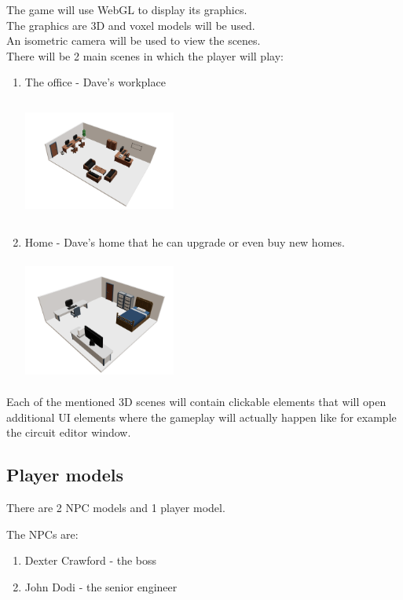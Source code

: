 \documentclass[12pt]{article}
\begin{document}
The game will use WebGL to display its graphics.\\
The graphics are 3D and voxel models will be used.\\
An isometric camera will be used to view the scenes.\\
There will be 2 main scenes in which the player will play:\\
\begin{enumerate}
    \item The office - Dave's workplace
          \begin{center}
              \includegraphics[width=5cm, height=4cm]{office.png}
          \end{center}
          \pagebreak
    \item Home - Dave's home that he can upgrade or even buy new homes.
          \begin{center}
              \includegraphics[width=5cm, height=4cm]{home.png}
          \end{center}
\end{enumerate}

Each of the mentioned 3D scenes will contain clickable elements that will open additional UI elements where the gameplay will actually happen 
like for example the circuit editor window.
\pagebreak

\subsection{Player models}
There are 2 NPC models and 1 player model.

The NPCs are:

\begin{enumerate}
    \item Dexter Crawford - the boss
    \item John Dodi - the senior engineer
\end{enumerate}
\end{document}
